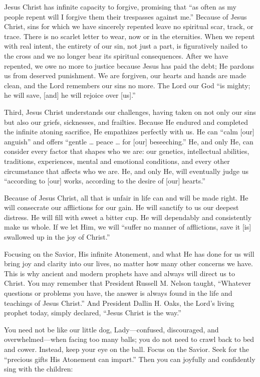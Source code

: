 \documentclass[letterpaper, 11pt]{report}
\begin{document}
Jesus Christ has infinite capacity to forgive, promising that “as often as my people repent will I forgive them their trespasses against me.” Because of Jesus Christ, sins for which we have sincerely repented leave no spiritual scar, track, or trace. There is no scarlet letter to wear, now or in the eternities. When we repent with real intent, the entirety of our sin, not just a part, is figuratively nailed to the cross and we no longer bear its spiritual consequences. After we have repented, we owe no more to justice because Jesus has paid the debt; He pardons us from deserved punishment. We are forgiven, our hearts and hands are made clean, and the Lord remembers our sins no more. The Lord our God “is mighty; he will save, [and] he will rejoice over [us].”

Third, Jesus Christ understands our challenges, having taken on not only our sins but also our griefs, sicknesses, and frailties. Because He endured and completed the infinite atoning sacrifice, He empathizes perfectly with us. He can “calm [our] anguish” and offers “gentle … peace … for [our] beseeching.” He, and only He, can consider every factor that shapes who we are: our genetics, intellectual abilities, traditions, experiences, mental and emotional conditions, and every other circumstance that affects who we are. He, and only He, will eventually judge us “according to [our] works, according to the desire of [our] hearts.”

Because of Jesus Christ, all that is unfair in life can and will be made right. He will consecrate our afflictions for our gain. He will sanctify to us our deepest distress. He will fill with sweet a bitter cup. He will dependably and consistently make us whole. If we let Him, we will “suffer no manner of afflictions, save it [is] swallowed up in the joy of Christ.”

Focusing on the Savior, His infinite Atonement, and what He has done for us will bring joy and clarity into our lives, no matter how many other concerns we have. This is why ancient and modern prophets have and always will direct us to Christ. You may remember that President Russell M. Nelson taught, “Whatever questions or problems you have, the answer is always found in the life and teachings of Jesus Christ.” And President Dallin H. Oaks, the Lord’s living prophet today, simply declared, “Jesus Christ is the way.”

You need not be like our little dog, Lady—confused, discouraged, and overwhelmed—when facing too many balls; you do not need to crawl back to bed and cower. Instead, keep your eye on the ball. Focus on the Savior. Seek for the “precious gifts His Atonement can impart.” Then you can joyfully and confidently sing with the children:
\end{document}

